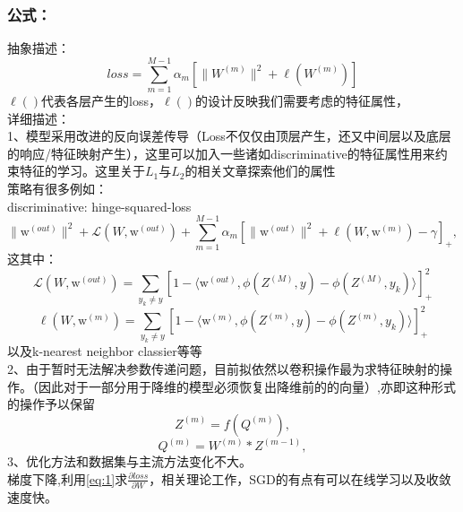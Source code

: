 \documentclass{article}
\begin{document}
\begin{CJK}{UTF8}{gbsn}
\subsubsection{公式：}
抽象描述：\\
\begin{equation}\label{eq:1}
loss=\sum^{M-1}_{m=1}\alpha_m\left[\|W^{(m)}\|^2+\ell(W^{(m)})\right]
\end{equation}
$\ell()$代表各层产生的loss，$\ell()$的设计反映我们需要考虑的特征属性，\\
详细描述：\\
1、模型采用改进的反向误差传导（Loss不仅仅由顶层产生，还又中间层以及底层的响应/特征映射产生），这里可以加入一些诸如discriminative的特征属性用来约束特征的学习。这里关于$L_1$与$L_2$的相关文章探索他们的属性\cite{lee2013study}\cite{moore2011l1}\\
策略有很多例如：\\
discriminative: hinge-squared-loss\cite{lee2014deeply}
\begin{equation}\label{eq:2}
 \|\mathrm{w}^{(out)}\|^2+\mathcal{L}(W,\mathrm{w}^{(out)})+\sum^{M-1}_{m=1}\alpha_m\left[\|\mathrm{w}^{(out)}\|^2+\ell(W,\mathrm{w}^{(m)})-\gamma\right]_+, \end{equation}
这其中：
\begin{equation}
\mathcal{L}(W,\mathrm{w}^{(out)})=\sum_{y_k\neq y}\left[1-\langle\mathrm{w}^{(out)},\phi(Z^{(M)},y)-\phi(Z^{(M)},y_k)\rangle\right]^2_+
\end{equation}
\begin{equation} 
\ell(W,\mathrm{w}^{(m)})=\sum_{y_k\neq y}\left[1-\langle\mathrm{w}^{(m)},\phi(Z^{(m)},y)-\phi(Z^{(m)},y_k)\rangle\right]^2_+
\end{equation}
以及k-nearest neighbor classier等等\\
2、由于暂时无法解决参数传递问题，目前拟依然以卷积操作最为求特征映射的操作。（因此对于一部分用于降维的模型必须恢复出降维前的的向量）,亦即这种形式的操作予以保留\\
\begin{equation} Z^{(m)}=f(Q^{(m)}), \end{equation}
\begin{equation} Q^{(m)}=W^{(m)}\ast Z^{(m-1)}, \end{equation}
3、优化方法和数据集与主流方法变化不大。\\
梯度下降,利用\eqref{eq:1}求$\frac{\partial{loss}}{\partial{W}}$，相关理论工作\cite{shamir2012stochastic}，SGD的有点有可以在线学习以及收敛速度快。

\end{CJK}
\end{document}
